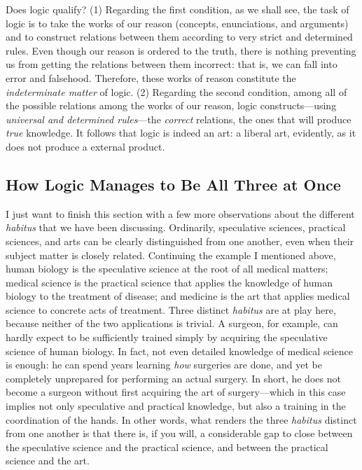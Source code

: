 \documentclass[article,12pt,a4paper,oneside]{memoir}
\begin{document}
    \noindent Does logic qualify? (1) Regarding the first condition, as
    we shall see, the task of logic is to take the works of our reason
    (concepts, enunciations, and arguments) and to construct relations
    between them according to very strict and determined rules. Even
    though our reason is ordered to the truth, there is nothing
    preventing us from getting the relations between them incorrect:
    that is, we can fall into error and falsehood. Therefore, these
    works of reason constitute the \emph{indeterminate matter} of logic.
    (2) Regarding the second condition, among all of the possible
    relations among the works of our reason, logic constructs---using
    \emph{universal and determined rules}---the \emph{correct}
    relations, the ones that will produce \emph{true} knowledge. It
    follows that logic is indeed an art: a liberal art, evidently, as it
    does not produce a external product.

    \hypertarget{how-logic-manages-to-be-all-three-at-once}{%
    \subsection{How Logic Manages to Be All Three at
    Once}\label{how-logic-manages-to-be-all-three-at-once}}

    I just want to finish this section with a few more observations
    about the different \emph{habitus} that we have been discussing.
    Ordinarily, speculative sciences, practical sciences, and arts can
    be clearly distinguished from one another, even when their subject
    matter is closely related. Continuing the example I mentioned above,
    human biology is the speculative science at the root of all medical
    matters; medical science is the practical science that applies the
    knowledge of human biology to the treatment of disease; and medicine
    is the art that applies medical science to concrete acts of
    treatment. Three distinct \emph{habitus} are at play here, because
    neither of the two applications is trivial. A surgeon, for example,
    can hardly expect to be sufficiently trained simply by acquiring the
    speculative science of human biology. In fact, not even detailed
    knowledge of medical science is enough: he can spend years learning
    \emph{how} surgeries are done, and yet be completely unprepared for
    performing an actual surgery. In short, he does not become a surgeon
    without first acquiring the art of surgery---which in this case
    implies not only speculative and practical knowledge, but also a
    training in the coordination of the hands. In other words, what
    renders the three \emph{habitus} distinct from one another is that
    there is, if you will, a considerable gap to close between the
    speculative science and the practical science, and between the
    practical science and the art.
\end{document}
